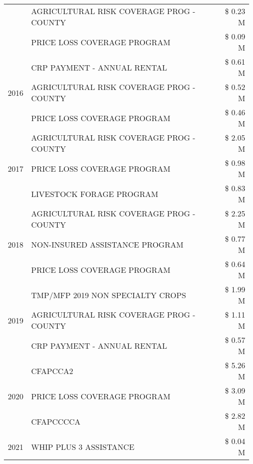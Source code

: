 \begin{tabular}{llr}
 & AGRICULTURAL RISK COVERAGE PROG - COUNTY & \$ 0.23 M \\
 & PRICE LOSS COVERAGE PROGRAM & \$ 0.09 M \\
\cline{1-3}
\multirow[t]{3}{*}{2016} & CRP PAYMENT - ANNUAL RENTAL & \$ 0.61 M \\
 & AGRICULTURAL RISK COVERAGE PROG - COUNTY & \$ 0.52 M \\
 & PRICE LOSS COVERAGE PROGRAM & \$ 0.46 M \\
\cline{1-3}
\multirow[t]{3}{*}{2017} & AGRICULTURAL RISK COVERAGE PROG - COUNTY & \$ 2.05 M \\
 & PRICE LOSS COVERAGE PROGRAM & \$ 0.98 M \\
 & LIVESTOCK FORAGE PROGRAM & \$ 0.83 M \\
\cline{1-3}
\multirow[t]{3}{*}{2018} & AGRICULTURAL RISK COVERAGE PROG - COUNTY & \$ 2.25 M \\
 & NON-INSURED ASSISTANCE PROGRAM & \$ 0.77 M \\
 & PRICE LOSS COVERAGE PROGRAM & \$ 0.64 M \\
\cline{1-3}
\multirow[t]{3}{*}{2019} & TMP/MFP 2019 NON SPECIALTY CROPS & \$ 1.99 M \\
 & AGRICULTURAL RISK COVERAGE PROG - COUNTY & \$ 1.11 M \\
 & CRP PAYMENT - ANNUAL RENTAL & \$ 0.57 M \\
\cline{1-3}
\multirow[t]{3}{*}{2020} & CFAPCCA2 & \$ 5.26 M \\
 & PRICE LOSS COVERAGE PROGRAM & \$ 3.09 M \\
 & CFAPCCCCA & \$ 2.82 M \\
\cline{1-3}
2021 & WHIP PLUS 3 ASSISTANCE & \$ 0.04 M \\
\cline{1-3}
\bottomrule
\end{tabular}
